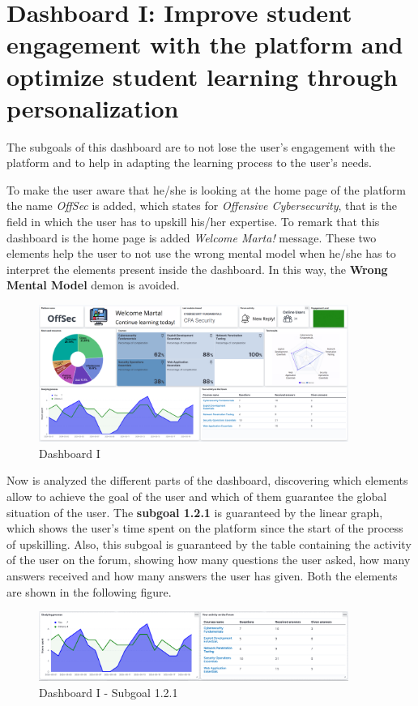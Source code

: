 \section{Dashboard I: Improve student engagement with the platform and optimize student learning through personalization}

The subgoals of this dashboard are to not lose the user's engagement with 
the platform and to help in adapting the learning process to the user's
needs. 

To make the user aware that he/she is looking
at the home page of the platform the name \textit{OffSec} is added,
which states for \textit{Offensive Cybersecurity}, that is the field
in which the user has to upskill his/her expertise. To remark that this
dashboard is the home page is added \textit{Welcome Marta!} message.
These two elements help the user to not use the wrong mental model
when he/she has to interpret the elements present inside the dashboard.
In this way, the \textbf{Wrong Mental Model} demon is avoided.

\begin{figure}[H]
    \centering
    \includegraphics[width=0.9\textwidth]{assets/dashboard_1.png}
    \caption{Dashboard I}
    \label{fig:dashboard_1}
\end{figure}

Now is analyzed the different parts of the dashboard, discovering which
elements allow to achieve the goal of the user and which of them guarantee the
global situation of the user. The \textbf{subgoal 1.2.1} is guaranteed by the linear graph,
which shows the user's time spent on the platform since the start of
the process of upskilling. Also, this subgoal is guaranteed by the table containing the activity of the
user on the forum, showing how many questions the user asked, how many
answers received and how many answers the user has given. 
Both the elements are shown in the following figure.

\begin{figure}[H]
    \centering
    \includegraphics[width=0.9\textwidth]{assets/dashboard_1_121.png}
    \caption{Dashboard I - Subgoal 1.2.1}
    \label{fig:dashboard_1_subgoal_121}
\end{figure}


